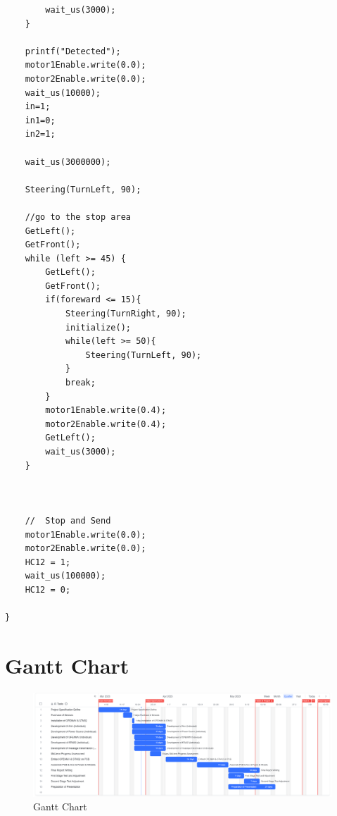 \documentclass[12pt, a4paper, oneside]{report}
\begin{document}
\begin{lstlisting}
        wait_us(3000);
    }
    
    printf("Detected");
    motor1Enable.write(0.0);
    motor2Enable.write(0.0);
    wait_us(10000);
    in=1;
    in1=0;
    in2=1;

    wait_us(3000000);

    Steering(TurnLeft, 90);

    //go to the stop area
    GetLeft();
    GetFront();   
    while (left >= 45) {
        GetLeft();
        GetFront();
        if(foreward <= 15){
            Steering(TurnRight, 90);
            initialize();
            while(left >= 50){
                Steering(TurnLeft, 90);
            }
            break;
        }
        motor1Enable.write(0.4);
        motor2Enable.write(0.4);
        GetLeft();
        wait_us(3000);
    }
    
    
    
    //  Stop and Send
    motor1Enable.write(0.0);
    motor2Enable.write(0.0);
    HC12 = 1;
    wait_us(100000);
    HC12 = 0;
   
}
\end{lstlisting}

\section*{Gantt Chart}
\begin{figure}[H]
  \centering
  \includegraphics[width=\textwidth]{pic/Gantt Chart.png}
  \caption{Gantt Chart}
  \label{fig:Gantt Chart}
\end{figure}
\end{document}
